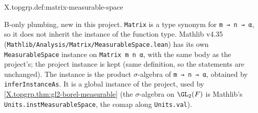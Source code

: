 \begin{definition}
\bonly
{}
\end{definition}
\begin{tfformal}{X.topgrp.def:matrix-measurable-space}
\begin{tffidelity}
B-only plumbing, new in this project. \texttt{Matrix} is a type synonym for \texttt{m → n → α}, so it does not inherit the instance of the function type. Mathlib v4.35 (\texttt{Mathlib/Analysis/Matrix/MeasurableSpace.lean}) has its own \texttt{MeasurableSpace} instance on \texttt{Matrix m n α}, with the same body as the project's; the project instance is kept (same definition, so the statements are unchanged). The instance is the product $\sigma$-algebra of \texttt{m → n → α}, obtained by \texttt{inferInstanceAs}. It is a global instance of the project, used by \cref{X.topgrp.thm:gl2-borel-measurable} (the $\sigma$-algebra on $\GL_2(F)$ is Mathlib's \texttt{Units.instMeasurableSpace}, the comap along \texttt{Units.val}).
\end{tffidelity}
\end{tfformal}

